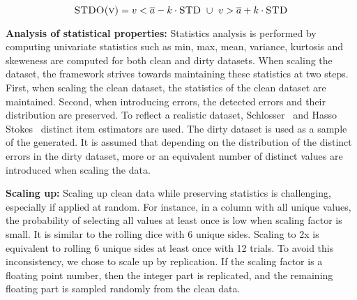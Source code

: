\begin{equation}
\label{eq:is_outlier_std}
\textsc{STDO(v)} = v < \overline{a} - k \cdot \textsc{STD} \ \cup \ v > \overline{a} + k \cdot \textsc{STD} 
\end{equation}

\textbf{Analysis of statistical properties:} 
Statistics analysis is performed by computing univariate statistics such as min, max, mean, variance, kurtosis and skeweness are computed for both clean and dirty datasets.
When scaling the dataset, the framework strives towards maintaining these statistics at two steps.
First, when scaling the clean dataset, the statistics of the clean dataset are maintained. 
Second, when introducing errors, the detected errors and their distribution are preserved.
To reflect a realistic dataset, Schlosser~\cite{HassNSS1995} and Hasso Stokes~\cite{HassS1998} distinct item estimators are used. 
The dirty dataset is used as a sample of the generated. It is assumed that depending on the distribution of the distinct errors in the dirty dataset, more or an equivalent number of distinct values are introduced when scaling the data.

\textbf{Scaling up:} 
Scaling up clean data while preserving statistics is challenging, especially if applied at random. 
For instance, in a column with all unique values, the probability of selecting all values at least once is low when scaling factor is small. 
It is similar to the rolling dice with 6 unique sides. 
Scaling to 2x is equivalent to rolling 6 unique sides at least once with 12 trials.
To avoid this inconsistency, we chose to scale up by replication. 
If the scaling factor is a floating point number, then the integer part is replicated, and the remaining floating part is sampled randomly from the clean data.

